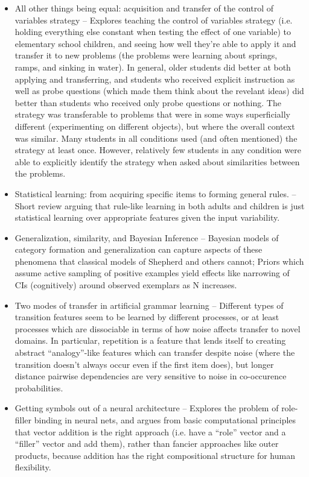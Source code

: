 \documentclass[10pt]{article}
\begin{document}
\begin{itemize}
\item All other things being equal: acquisition and transfer of the control of variables strategy -- Explores teaching the control of variables strategy (i.e. holding everything else constant when testing the effect of one variable) to elementary school children, and seeing how well they're able to apply it and transfer it to new problems (the problems were learning about springs, ramps, and sinking in water). In general, older students did better at both applying and transferring, and students who received explicit instruction as well as probe questions (which made them think about the revelant ideas) did better than students who received only probe questions or nothing. The strategy was transferable to problems that were in some ways superficially different (experimenting on different objects), but where the overall context was similar. Many students in all conditions used (and often mentioned) the strategy at least once. However, relatively few students in any condition were able to explicitly identify the strategy when asked about similarities between the problems. \citep{Chen1999}
\item Statistical learning:  from acquiring specific items to forming general rules. -- Short review arguing that rule-like learning in both adults and children is just statistical learning over appropriate features given the input variability. 
\item Generalization, similarity, and Bayesian Inference -- Bayesian models of category formation and generalization can capture aspects of these phenomena that classical models of Shepherd and others cannot; Priors which assume active sampling of positive examples yield effects like narrowing of CIs (cognitively) around observed exemplars as N increases. \citep{Tenenbaum2001}
\item Two modes of transfer in artificial grammar learning -- Different types of transition features seem to be learned by different processes, or at least processes which are dissociable in terms of how noise affects transfer to novel domains. In particular, repetition is a feature that lends itself to creating abstract ``analogy''-like features which can transfer despite noise (where the transition doesn't always occur even if the first item does), but longer distance pairwise dependencies are very sensitive to noise in co-occurence probabilities. \citep{Tunney2001}
\item Getting symbols out of a neural architecture -- Explores the problem of role-filler binding in neural nets, and argues from basic computational principles that vector addition is the right approach (i.e. have a ``role'' vector and a ``filler'' vector and add them), rather than fancier approaches like outer products, because addition has the right compositional structure for human flexibility. \citet{HummelSomeYear}

\end{itemize}
\end{document}
